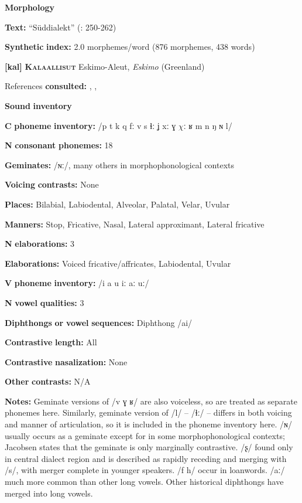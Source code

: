 \begin{styleBody}
\textbf{Morphology}

\textbf{Text:} “Süddialekt” (\citealt{GeorgVolodin1999}: 250-262)

\textbf{Synthetic} \textbf{index:} 2.0 morphemes/word (876 morphemes, 438 words)

\textbf{[kal]}   \textbf{\textsc{Kalaallisut}}    Eskimo-Aleut, \textit{Eskimo} (Greenland)

References \textbf{consulted:} \citet{Fortescue1984}, \citet{Hagerup2011}, \citet{Jacobsen2000}

\textbf{Sound} \textbf{inventory}

\textbf{C} \textbf{phoneme} \textbf{inventory:} /p t k q fː v s ɬː ʝ xː ɣ $\chi ː$ ʁ m n ŋ ɴ l/

\textbf{N} \textbf{consonant} \textbf{phonemes:} 18

\textbf{Geminates:} /ɴː/, many others in morphophonological contexts

\textbf{Voicing} \textbf{contrasts:} None

\textbf{Places:} Bilabial, Labiodental, Alveolar, Palatal, Velar, Uvular

\textbf{Manners:} Stop, Fricative, Nasal, Lateral approximant, Lateral fricative 

\textbf{N} \textbf{elaborations:} 3

\textbf{Elaborations:} Voiced fricative/affricates, Labiodental, Uvular

\textbf{V} \textbf{phoneme} \textbf{inventory:} /i a u iː aː uː/

\textbf{N} \textbf{vowel} \textbf{qualities:} 3

\textbf{Diphthongs} \textbf{or} \textbf{vowel} \textbf{sequences:} Diphthong /ai/

\textbf{Contrastive} \textbf{length:} All

\textbf{Contrastive} \textbf{nasalization:} None

\textbf{Other} \textbf{contrasts:} N/A

\textbf{Notes:} Geminate versions of /v ɣ ʁ/ are also voiceless, so are treated as separate phonemes here. Similarly, geminate version of /l/ -- /ɬː/ -- differs in both voicing and manner of articulation, so it is included in the phoneme inventory here. /ɴ/ usually occurs as a geminate except for in some morphophonological contexts; Jacobsen states that the geminate is only marginally contrastive. /ʂ/ found only in central dialect region and is described as rapidly receding and merging with /s/, with merger complete in younger speakers. /f h/ occur in loanwords. /aː/ much more common than other long vowels. Other historical diphthongs have merged into long vowels.


\end{styleBody}
